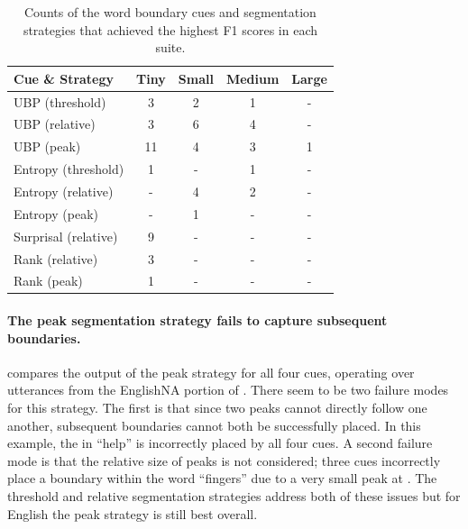 \begin{table}[]
    \centering
    \small
    \begin{tabular}{lcccc}
    \toprule
    Cue \& Strategy & Tiny & Small & Medium & Large \\
    \midrule
    UBP (threshold) & 3 & 2 & 1 & - \\
    UBP (relative) & 3 & 6 & 4 & - \\
    UBP (peak) & 11 & 4 & 3 & 1 \\
    Entropy (threshold) & 1 & - & 1 & - \\
    Entropy (relative) & - & 4 & 2 & - \\
    Entropy (peak) & - & 1 & - & - \\
    Surprisal (relative) & 9 & - & - & - \\
    Rank (relative) & 3 & - & - & - \\
    Rank (peak) & 1 & - & - & - \\
    \bottomrule
    \end{tabular}
\caption{Counts of the word boundary cues and segmentation strategies that achieved the highest F1 scores in each suite.}
\label{tab:15-bestcues}
\end{table}


\paragraph{The peak segmentation strategy fails to capture subsequent boundaries.}
 compares the output of the peak strategy for all four cues, operating over utterances from the EnglishNA portion of \ipachildes. There seem to be two failure modes for this strategy. The first is that since two peaks cannot directly follow one another, subsequent boundaries cannot both be successfully placed. In this example, the  in ``help'' is incorrectly placed by all four cues. A second failure mode is that the relative size of peaks is not considered; three cues incorrectly place a boundary within the word ``fingers'' due to a very small peak at \ttipa{\textschwa}. The threshold and relative segmentation strategies address both of these issues but for English the peak strategy is still best overall.

